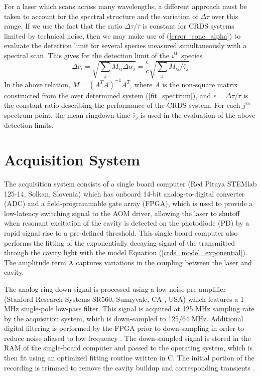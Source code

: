 \documentclass[12pt]{report}
\begin{document}
	For a laser which scans across many wavelengths, a different approach must be taken to account for the spectral structure and the variation of $\Delta \tau$ over this range. If we use the fact that the ratio $\Delta \tau / \bar{\tau}$ is constant for CRDS systems limited by technical noise, then we may make use of (\ref{error_conc_alpha}) to evaluate the detection limit for several species measured simultaneously with a spectral scan. This gives for the detection limit of the $i^\mathrm{th}$ species 
	\begin{equation}
		\Delta c_i = \sqrt{\sum_j M_{ij} \Delta \alpha_j} = \frac{\epsilon}{c} \sqrt{\sum_j M_{ij} / \bar{\tau}_j}
	\end{equation}
	In the above relation, $M = (A^TA)^{-1} A^T$, where $A$ is the non-square matrix constructed from the over determined system (\ref{fit_spectrum}), and $\epsilon = \Delta \tau / \bar{\tau}$ is the constant ratio describing the performance of the CRDS system. For each $j^\mathrm{th}$ spectrum point, the mean ringdown time $\bar{\tau}_j$ is used in the evaluation of the above detection limits.
	
	\section{Acquisition System}
	The acquisition system consists of a single
	board computer (Red Pitaya STEMlab 125-14, Solkan, Slovenia) which has onboard 14-bit
	analog-to-digital converter (ADC) and a field-programmable gate array (FPGA), which
	is used to provide a low-latency switching signal to the AOM driver, allowing the laser
	to shutoff when resonant excitation of the cavity is detected on the photodiode (PD) by a
	rapid signal rise to a pre-defined threshold. This single board computer also performs the
	fitting of the exponentially decaying signal of the transmitted through the cavity light with
	the model Equation (\ref{crds_model_exponential}). The amplitude term A captures variations in the coupling between the laser and cavity.
	
	The analog ring-down signal is processed using a low-noise pre-amplifier (Stanford
	Research Systems SR560, Sunnyvale, CA , USA) which features a 1 MHz single-pole low-pass filter. This signal is acquired at 125 MHz sampling rate by the acquisition system, which
	is down-sampled to 125/64 MHz. Additional digital filtering is performed by the FPGA
	prior to down-sampling in order to reduce noise aliased to low frequency \cite{frontiers_mol_spec}. The down-sampled signal is stored in the RAM of the single-board computer and passed to the
	operating system, which is then fit using an optimized fitting routine written in C. The initial
	portion of the recording is trimmed to remove the cavity buildup and corresponding
	transients \cite{frontiers_mol_spec}.
	
\end{document}
